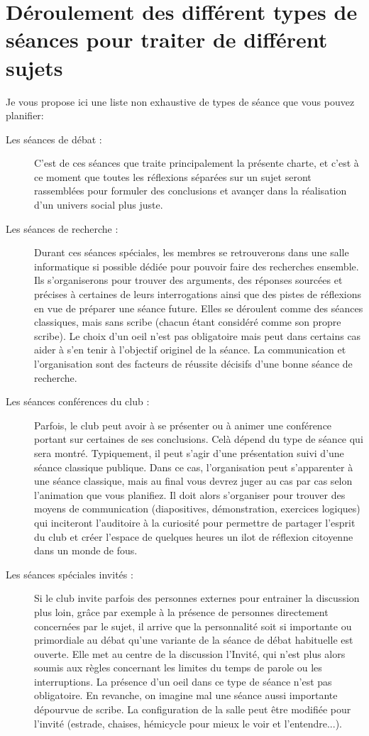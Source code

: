 \documentclass[a4paper,11pt]{article}
\begin{document}
\section{Déroulement des différent types de séances pour traiter de différent sujets}
Je vous propose ici une liste non exhaustive de types de séance que vous pouvez planifier:
\begin{description}
 \item [Les séances de débat :] C'est de ces séances que traite principalement la présente charte, et c'est à ce moment que toutes les réflexions séparées sur un sujet seront rassemblées pour formuler des conclusions et avançer dans la réalisation d'un univers social plus juste.
 \item [Les séances de recherche :] Durant ces séances spéciales, les membres se retrouverons dans une salle informatique si possible dédiée pour pouvoir faire des recherches ensemble. Ils s'organiserons pour trouver des arguments, des réponses sourcées et précises à certaines de leurs interrogations ainsi que des pistes de réflexions en vue de préparer une séance future. Elles se déroulent comme des séances classiques, mais sans scribe (chacun étant considéré comme son propre scribe). Le choix d'un oeil n'est pas obligatoire mais peut dans certains cas aider à s'en tenir à l'objectif originel de la séance. La communication et l'organisation sont des facteurs de réussite décisifs d'une bonne séance de recherche.
 \item [Les séances conférences du club :] Parfois, le club peut avoir à se présenter ou à animer une conférence portant sur certaines de ses conclusions. Celà dépend du type de séance qui sera montré. Typiquement, il peut s'agir d'une présentation suivi d'une séance classique publique. Dans ce cas, l'organisation peut s'apparenter à une séance classique, mais au final vous devrez juger au cas par cas selon l'animation que vous planifiez. Il doit alors s'organiser pour trouver des moyens de communication (diapositives, démonstration, exercices logiques) qui inciteront l'auditoire à la curiosité pour permettre de partager l'esprit du club et créer l'espace de quelques heures un ilot de réflexion citoyenne dans un monde de fous. 
 \item [Les séances spéciales invités :] Si le club invite parfois des personnes externes pour entrainer la discussion plus loin, grâce par exemple à la présence de personnes directement concernées par le sujet, il arrive que la personnalité soit si importante ou primordiale au débat qu'une variante de la séance de débat habituelle est ouverte. Elle met au centre de la discussion l'Invité, qui n'est plus alors soumis aux règles concernant les limites du temps de parole ou les interruptions. La présence d'un oeil dans ce type de séance n'est pas obligatoire. En revanche, on imagine mal une séance aussi importante dépourvue de scribe. La configuration de la salle peut être modifiée pour l'invité (estrade, chaises, hémicycle pour mieux le voir et l'entendre...).
\end{description}
\end{document}
